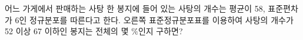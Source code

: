 \noindent\begin{minipage}[t]{0.58\linewidth}\vspace{0pt}\raggedright 어느 가게에서 판매하는 사탕 한 봉지에 들어 있는 사탕의 개수는 평균이 58, 표준편차가 6인 정규분포를 따른다고 한다. 오른쪽 표준정규분포표를 이용하여 사탕의 개수가 52 이상 67 이하인 봉지는 전체의 몇 $\%$인지 구하면?\end{minipage}\hfill\begin{minipage}[t]{0.4\linewidth}\vspace{0pt}\centering \resizebox{\ifdim\width>\linewidth\linewidth\else\width\fi}{!}{}\end{minipage}\par
{}
